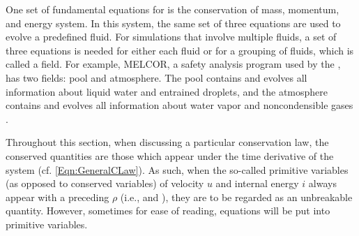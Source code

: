 One set of fundamental equations for \TH is the conservation of mass, momentum, and energy system.
In this system, the same set of three equations are used to evolve a predefined fluid.
For simulations that involve multiple fluids, a set of three equations is needed for either each fluid or for a grouping of fluids, which is called a field.
For example, MELCOR, a safety analysis program used by the , has two fields: pool and atmosphere.
The pool contains and evolves all information about liquid water and entrained droplets, and the atmosphere contains and evolves all information about water vapor and noncondensible gases \cite{sandia_national_laboratories_melcor_2011}.

Throughout this section, when discussing a particular conservation law, the conserved quantities are those which appear under the time derivative of the system (cf. \cref{Eqn:GeneralCLaw}).
As such, when the so-called primitive variables (as opposed to conserved variables) of velocity $u$ and internal energy $i$ always appear with a preceding $\rho$ (i.e., \rhou and \rhoi), they are to be regarded as an unbreakable quantity.
However, sometimes for ease of reading, equations will be put into primitive variables.

